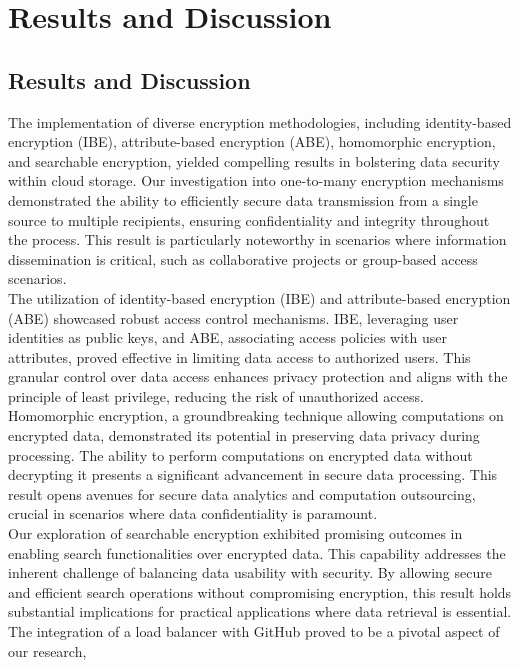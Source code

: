 \chapter{Results and Discussion }
\section{Results and Discussion}
The implementation of diverse encryption methodologies, including identity-based encryption (IBE),
attribute-based encryption (ABE), homomorphic encryption, and searchable encryption, yielded
compelling results in bolstering data security within cloud storage. Our investigation into one-to-many encryption mechanisms demonstrated the ability to efficiently secure data transmission from a single source to multiple recipients, ensuring confidentiality and integrity throughout the process.
This result is particularly noteworthy in scenarios where information dissemination is critical, such as
collaborative projects or group-based access scenarios.\\
The utilization of identity-based encryption (IBE) and attribute-based encryption (ABE) showcased
robust access control mechanisms. IBE, leveraging user identities as public keys, and ABE, associating access policies with user attributes, proved effective in limiting data access to authorized
users. This granular control over data access enhances privacy protection and aligns with the principle
of least privilege, reducing the risk of unauthorized access.\\
Homomorphic encryption, a groundbreaking technique allowing computations on encrypted data,
demonstrated its potential in preserving data privacy during processing. The ability to perform
computations on encrypted data without decrypting it presents a significant advancement in secure
data processing. This result opens avenues for secure data analytics and computation outsourcing,
crucial in scenarios where data confidentiality is paramount.\\
Our exploration of searchable encryption exhibited promising outcomes in enabling search
functionalities over encrypted data. This capability addresses the inherent challenge of balancing data
usability with security. By allowing secure and efficient search operations without compromising
encryption, this result holds substantial implications for practical applications where data retrieval is
essential.\\
The integration of a load balancer with GitHub proved to be a pivotal aspect of our research,
